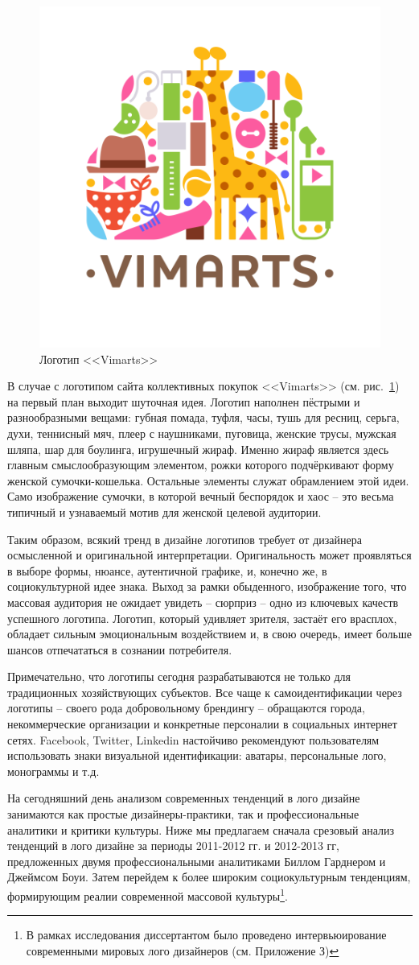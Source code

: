 \begin{figure}[h!]
  \centering
  \includegraphics[width=.3\linewidth]{images/vimarts}
  \caption{Логотип <<Vimarts>>}
  \label{fig:vimarts}
\end{figure}

В случае с логотипом сайта коллективных покупок <<Vimarts>> (см. рис.~\ref{fig:vimarts}) на первый план выходит шуточная идея. Логотип наполнен пёстрыми и разнообразными вещами: губная помада, туфля, часы, тушь для ресниц, серьга, духи, теннисный мяч, плеер с наушниками, пуговица, женские трусы, мужская шляпа, шар для боулинга, игрушечный жираф. Именно жираф является здесь главным смыслообразующим элементом, рожки которого подчёркивают форму женской сумочки-кошелька. Остальные элементы служат обрамлением этой идеи. Само изображение сумочки, в которой вечный беспорядок и хаос -- это весьма типичный и узнаваемый мотив для женской целевой аудитории.

Таким образом, всякий тренд в дизайне логотипов требует от дизайнера осмысленной и оригинальной интерпретации. Оригинальность может проявляться в выборе формы, нюансе, аутентичной графике, и, конечно же, в социокультурной идее знака. Выход за рамки обыденного, изображение того, что массовая аудитория не ожидает увидеть -- сюрприз -- одно из ключевых качеств успешного логотипа. Логотип, который удивляет зрителя, застаёт его врасплох, обладает сильным эмоциональным воздействием и, в свою очередь, имеет больше шансов отпечататься в сознании потребителя.

Примечательно, что логотипы сегодня разрабатываются не только для традиционных хозяйствующих субъектов. Все чаще к самоидентификации через логотипы -- своего рода добровольному брендингу -- обращаются города, некоммерческие организации и  конкретные персоналии в социальных интернет сетях. Facebook, Twitter, Linkedin настойчиво рекомендуют пользователям использовать знаки визуальной идентификации: аватары, персональные лого, монограммы и т.д.

На сегодняшний день анализом современных тенденций в лого дизайне занимаются как простые дизайнеры-практики, так и профессиональные аналитики и критики культуры. Ниже мы предлагаем сначала срезовый анализ тенденций в
лого дизайне за периоды 2011-2012 гг. и 2012-2013 гг,  предложенных двумя профессиональными
аналитиками Биллом Гарднером и Джеймсом Боуи. Затем перейдем к более широким социокультурным
тенденциям, формирующим реалии современной массовой культуры\footnote{В рамках исследования диссертантом было проведено интервьюирование современными мировых лого дизайнеров (см. Приложение З)}.

